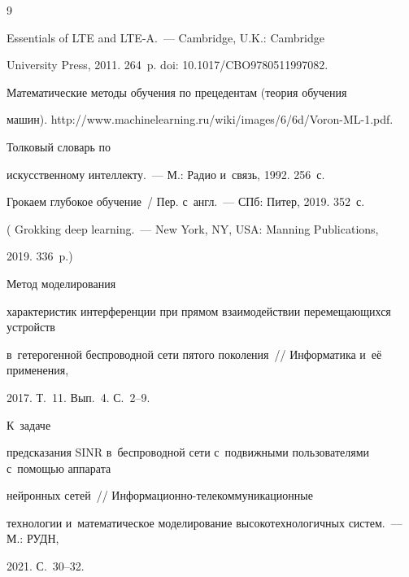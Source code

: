 {\small\frenchspacing


{%




\begin{thebibliography}{9}




 Essentials of LTE and LTE-A.~--- Cambridge, U.K.: Cambridge 


University Press, 2011. 264~p. doi: 10.1017/CBO9780511997082.




 Математические методы обучения по прецедентам (теория обучения 


машин). {\sf http://www.machinelearning.ru/wiki/images/6/6d/Voron-ML-1.pdf}.




 Толковый словарь по 


искусственному интеллекту.~--- М.: Радио и~связь, 1992. 256~с.




 Грокаем глубокое обучение~/ Пер. с~англ.~--- СПб: Питер, 2019. 352~с. 


( Grokking deep learning.~--- New York, NY, USA: Manning Publications, 


2019. 336~p.)




 Метод моделирования 


характеристик интерференции при прямом взаимодействии перемещающихся устройств 


в~гетерогенной беспроводной сети пятого поколения~/\!\!/ Информатика и~её применения, 


2017. Т.~11. Вып.~4. С.~2--9.




 К~задаче 


предсказания SINR в~беспроводной сети с~подвижными пользователями с~помощью аппарата 


нейронных сетей~/\!\!/ Ин\-фор\-ма\-ци\-он\-но-те\-ле\-ком\-му\-ни\-ка\-ци\-он\-ные 


технологии и~математическое моделирование высокотехнологичных сис\-тем.~--- М.: РУДН, 


2021. С.~30--32.


  \end{thebibliography}


} }











